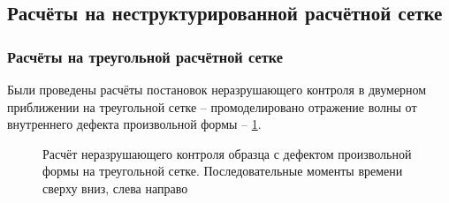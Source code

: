\subsection{Расчёты на неструктурированной расчётной сетке}
\subsubsection{Расчёты на треугольной расчётной сетке}
Были проведены расчёты постановок неразрушающего контроля в двумерном приближении на треугольной сетке -- промоделировано отражение волны от внутреннего дефекта произвольной формы -- \ref{pic:2d}.
\begin{figure}%
	\caption{Расчёт неразрушающего контроля образца с дефектом произвольной формы на треугольной сетке. Последовательные моменты времени сверху вниз, слева направо}
	\label{pic:2d}
\end{figure}

